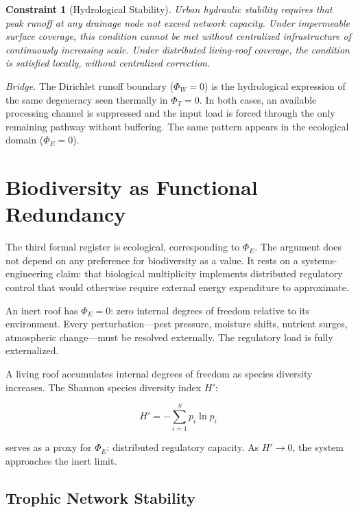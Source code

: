 \documentclass[12pt, a4paper]{article}
\theoremstyle{plain}
\newtheorem{constraint}{Constraint}
\theoremstyle{remark}
\begin{document}
\begin{constraint}[Hydrological Stability]
Urban hydraulic stability requires that peak runoff at any drainage node not exceed network capacity. Under impermeable surface coverage, this condition cannot be met without centralized infrastructure of continuously increasing scale. Under distributed living-roof coverage, the condition is satisfied locally, without centralized correction.
\end{constraint}

\medskip
\noindent\textit{Bridge.}\; The Dirichlet runoff boundary ($\Phi_W = 0$) is the hydrological expression of the same degeneracy seen thermally in $\Phi_T = 0$. In both cases, an available processing channel is suppressed and the input load is forced through the only remaining pathway without buffering. The same pattern appears in the ecological domain ($\Phi_E = 0$).

\section{Biodiversity as Functional Redundancy}

The third formal register is ecological, corresponding to $\Phi_E$. The argument does not depend on any preference for biodiversity as a value. It rests on a systems-engineering claim: that biological multiplicity implements distributed regulatory control that would otherwise require external energy expenditure to approximate.

An inert roof has $\Phi_E = 0$: zero internal degrees of freedom relative to its environment. Every perturbation---pest pressure, moisture shifts, nutrient surges, atmospheric change---must be resolved externally. The regulatory load is fully externalized.

A living roof accumulates internal degrees of freedom as species diversity increases. The Shannon species diversity index $H'$:

\begin{equation}
H' = -\sum_{i=1}^{S} p_i \ln p_i
\label{eq:shannon}
\end{equation}

\noindent serves as a proxy for $\Phi_E$: distributed regulatory capacity. As $H' \to 0$, the system approaches the inert limit.

\subsection{Trophic Network Stability}
\end{document}
